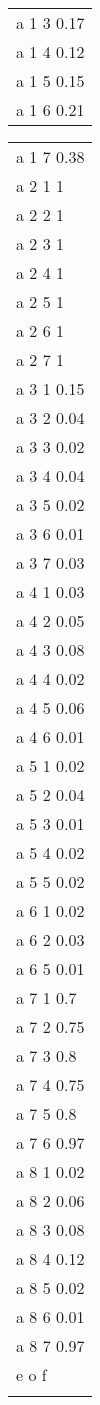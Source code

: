 \begin{center}
\begin{tabular}{l@{\hspace*{50pt}}}
a 1 3 0.17        \\
a 1 4 0.12        \\
a 1 5 0.15        \\
a 1 6 0.21        \\
\end{tabular}
\begin{tabular}{|@{\hspace*{80pt}}l}
a 1 7 0.38        \\
a 2 1 1           \\
a 2 2 1           \\
a 2 3 1           \\
a 2 4 1           \\
a 2 5 1           \\
a 2 6 1           \\
a 2 7 1           \\
a 3 1 0.15        \\
a 3 2 0.04        \\
a 3 3 0.02        \\
a 3 4 0.04        \\
a 3 5 0.02        \\
a 3 6 0.01        \\
a 3 7 0.03        \\
a 4 1 0.03        \\
a 4 2 0.05        \\
a 4 3 0.08        \\
a 4 4 0.02        \\
a 4 5 0.06        \\
a 4 6 0.01        \\
a 5 1 0.02        \\
a 5 2 0.04        \\
a 5 3 0.01        \\
a 5 4 0.02        \\
a 5 5 0.02        \\
a 6 1 0.02        \\
a 6 2 0.03        \\
a 6 5 0.01        \\
a 7 1 0.7         \\
a 7 2 0.75        \\
a 7 3 0.8         \\
a 7 4 0.75        \\
a 7 5 0.8         \\
a 7 6 0.97        \\
a 8 1 0.02        \\
a 8 2 0.06        \\
a 8 3 0.08        \\
a 8 4 0.12        \\
a 8 5 0.02        \\
a 8 6 0.01        \\
a 8 7 0.97        \\
e o f             \\
\\
\end{tabular}
\end{center}

